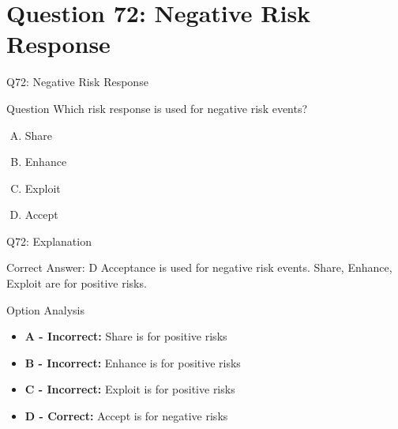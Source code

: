 \documentclass{beamer}
\begin{document}
	\section{Question 72: Negative Risk Response}
	
	\begin{frame}{Q72: Negative Risk Response}
		\begin{block}{Question}
			Which risk response is used for negative risk events?
		\end{block}
		\begin{enumerate}[(A)]
			\item Share
			\item Enhance
			\item Exploit
			\item Accept
		\end{enumerate}
	\end{frame}
	
	\begin{frame}{Q72: Explanation}
		\begin{block}{Correct Answer: D}
			Acceptance is used for negative risk events. Share, Enhance, Exploit are for positive risks.
		\end{block}
		\begin{block}{Option Analysis}
			\begin{itemize}
				\item \textbf{A - Incorrect:} Share is for positive risks
				\item \textbf{B - Incorrect:} Enhance is for positive risks
				\item \textbf{C - Incorrect:} Exploit is for positive risks
				\item \textbf{D - Correct:} Accept is for negative risks
			\end{itemize}
		\end{block}
	\end{frame}
	
	
\end{document}
